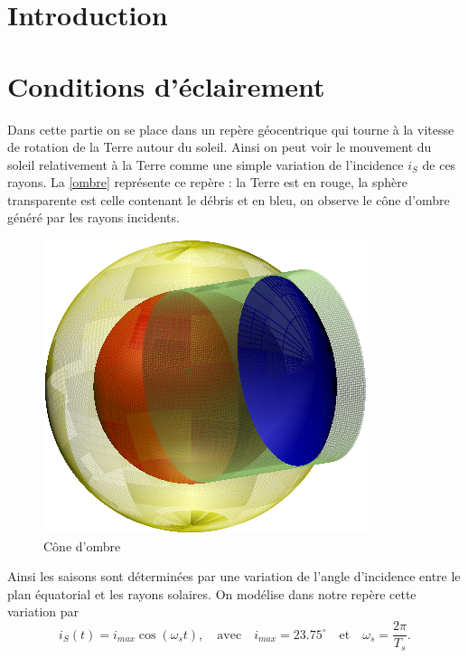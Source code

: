 \documentclass[a4paper,11pt]{article}
\numberwithin{section}{part}
\begin{document}
\section{Introduction}









\section{Conditions d'\'eclairement}

Dans cette partie on se place dans un rep\`ere g\'eocentrique qui tourne \`a la vitesse de rotation de la Terre autour du soleil. Ainsi on peut voir le mouvement du soleil relativement \`a la Terre comme une simple variation de l'incidence $i_S$ de ces rayons.  La \autoref{ombre} repr\'esente ce rep\`ere : la Terre est en rouge, la sph\`ere transparente est celle contenant le d\'ebris et en bleu, on observe le c\^one d'ombre g\'en\'er\'e par les rayons incidents. 

 \begin{figure}[ht]
    \centering
    \includegraphics[width=.6\textwidth]{figures/ombre.pdf}
    \caption{C\^one d'ombre}\label{ombre}
 \end{figure}
 
Ainsi les saisons sont d\'etermin\'ees par une variation de l'angle d'incidence entre le plan \'equatorial et les rayons solaires.
On mod\'elise dans notre rep\`ere cette variation par 
\[ i_{S}(t)= i_{max}\cos(\omega_{s}t), \quad \text{avec} \quad i_{max}=23.75^\circ \quad \text{et}  \quad \omega_s=\frac{2\pi}{T_s}.\]
 
\end{document}
